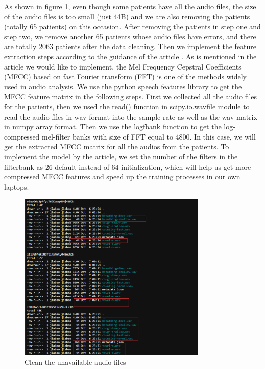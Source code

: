 \documentclass[11pt]{article}
\begin{document}
As shown in figure \ref{fig:clean_unavailable_audio}, even though some patients have all the audio files, the size of the audio files is too small (just 44B) and we are also removing the patients (totally 65 patients) on this occasion. After removing the patients in step one and step two, we remove another 65 patients whose audio files have errors, and there are totally 2063 patients after the data cleaning.
Then we implement the feature extraction steps according to the guidance of the article \cite{xue2021exploring}. As is mentioned in the article we would like to implement, the Mel Frequency Cepstral Coefficients (MFCC) based on fast Fourier transform (FFT) is one of the methods widely used in audio analysis. We use the python speech features library \cite{pyspeech} to get the MFCC feature matrix in the following steps. First we collected all the audio files for the patients, then we used the read() function in scipy.io.wavfile module to read the audio files in wav format into the sample rate as well as the wav matrix in numpy array format. Then we use the logfbank function to get the log-compressed mel-filter banks with size of FFT equal to 4800. In this case, we will get the extracted MFCC matrix for all the audios from the patients. To implement the model by the article, we set the number of the filters in the filterbank as 26 default instead of 64 initialization, which will help us get more compressed MFCC features and speed up the training processes in our own laptops.

\begin{figure}[htbp]{}
	\centering
    \includegraphics[width=0.8\textwidth]{./imgs/mfccFig1-new.png} %
    \caption{Clean the unavailable audio files}
    \label{fig:clean_unavailable_audio}
\end{figure}
\end{document}
